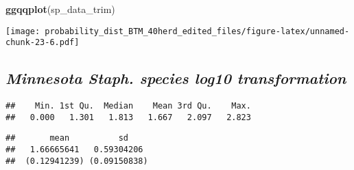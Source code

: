 \documentclass[]{article}
\newenvironment{Shaded}{\begin{snugshade}}{\end{snugshade}}
\newcommand{\KeywordTok}[1]{\textcolor[rgb]{0.13,0.29,0.53}{\textbf{#1}}}
\newcommand{\StringTok}[1]{\textcolor[rgb]{0.31,0.60,0.02}{#1}}
\newcommand{\CommentTok}[1]{\textcolor[rgb]{0.56,0.35,0.01}{\textit{#1}}}
\newcommand{\OperatorTok}[1]{\textcolor[rgb]{0.81,0.36,0.00}{\textbf{#1}}}
\newcommand{\NormalTok}[1]{#1}
\begin{document}
\begin{Shaded}
\begin{Highlighting}[]
\KeywordTok{ggqqplot}\NormalTok{(sp_data_trim)}
\end{Highlighting}
\end{Shaded}

\texttt{[image: probability\_dist\_BTM\_40herd\_edited\_files/figure-latex/unnamed-chunk-23-6.pdf]}

\subsection{\texorpdfstring{\textbf{\emph{Minnesota Staph. species log10
transformation}}}{Minnesota Staph. species log10 transformation}}\label{minnesota-staph.-species-log10-transformation}

\begin{Shaded}
\end{Shaded}

\begin{verbatim}
##    Min. 1st Qu.  Median    Mean 3rd Qu.    Max. 
##   0.000   1.301   1.813   1.667   2.097   2.823
\end{verbatim}

\begin{Shaded}
\end{Shaded}

\begin{verbatim}
##       mean          sd    
##   1.66665641   0.59304206 
##  (0.12941239) (0.09150838)
\end{verbatim}
\end{document}
